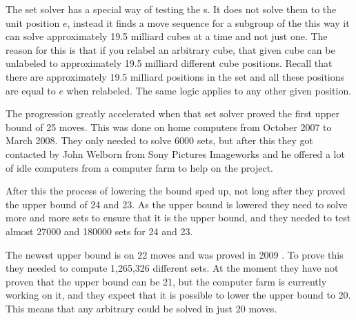 The set solver has a special way of testing the \rubik{}s. It does not solve them to the unit position $e$, instead it finds a move sequence for a subgroup of the \rubik{} this way it can solve approximately 19.5 milliard cubes at a time and not just one. The reason for this is that if you relabel an arbitrary cube, that given cube can be unlabeled to approximately 19.5 milliard different cube positions. Recall that there are approximately 19.5 milliard positions in the set  and all these positions are equal to $e$ when relabeled. The same logic applies to any other given position.

The progression greatly accelerated when that set solver proved the first upper bound of 25 moves. This was done on home computers from October 2007 to March 2008. They only needed to solve 6000 sets, but after this they got contacted by John Welborn from Sony Pictures Imageworks and he offered a lot of idle computers from a computer farm to help on the project. 

After this the process of lowering the bound sped up, not long after they proved the upper bound of 24 and 23. As the upper bound is lowered they need to solve more and more sets to ensure that it is the upper bound, and they needed to test almost 27000 and 180000 sets for 24 and 23. 

The newest upper bound is on 22 moves and was proved in 2009 \cite{rokicki09}. To prove this they needed to compute 1,265,326 different sets. At the moment they have not proven that the upper bound can be 21, but the computer farm is currently working on it, and they expect that it is possible to lower the upper bound to 20. This means that any arbitrary \rubik{} could be solved in just 20 moves.
